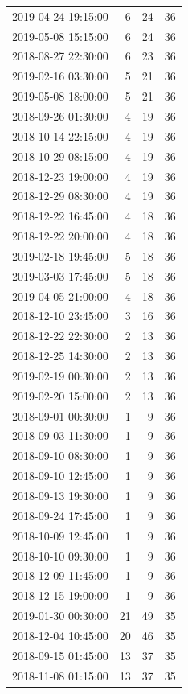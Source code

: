 \begin{tabular}{lrrr}
2019-04-24 19:15:00 & 6 & 24 & 36 \\
2019-05-08 15:15:00 & 6 & 24 & 36 \\
2018-08-27 22:30:00 & 6 & 23 & 36 \\
2019-02-16 03:30:00 & 5 & 21 & 36 \\
2019-05-08 18:00:00 & 5 & 21 & 36 \\
2018-09-26 01:30:00 & 4 & 19 & 36 \\
2018-10-14 22:15:00 & 4 & 19 & 36 \\
2018-10-29 08:15:00 & 4 & 19 & 36 \\
2018-12-23 19:00:00 & 4 & 19 & 36 \\
2018-12-29 08:30:00 & 4 & 19 & 36 \\
2018-12-22 16:45:00 & 4 & 18 & 36 \\
2018-12-22 20:00:00 & 4 & 18 & 36 \\
2019-02-18 19:45:00 & 5 & 18 & 36 \\
2019-03-03 17:45:00 & 5 & 18 & 36 \\
2019-04-05 21:00:00 & 4 & 18 & 36 \\
2018-12-10 23:45:00 & 3 & 16 & 36 \\
2018-12-22 22:30:00 & 2 & 13 & 36 \\
2018-12-25 14:30:00 & 2 & 13 & 36 \\
2019-02-19 00:30:00 & 2 & 13 & 36 \\
2019-02-20 15:00:00 & 2 & 13 & 36 \\
2018-09-01 00:30:00 & 1 & 9 & 36 \\
2018-09-03 11:30:00 & 1 & 9 & 36 \\
2018-09-10 08:30:00 & 1 & 9 & 36 \\
2018-09-10 12:45:00 & 1 & 9 & 36 \\
2018-09-13 19:30:00 & 1 & 9 & 36 \\
2018-09-24 17:45:00 & 1 & 9 & 36 \\
2018-10-09 12:45:00 & 1 & 9 & 36 \\
2018-10-10 09:30:00 & 1 & 9 & 36 \\
2018-12-09 11:45:00 & 1 & 9 & 36 \\
2018-12-15 19:00:00 & 1 & 9 & 36 \\
2019-01-30 00:30:00 & 21 & 49 & 35 \\
2018-12-04 10:45:00 & 20 & 46 & 35 \\
2018-09-15 01:45:00 & 13 & 37 & 35 \\
2018-11-08 01:15:00 & 13 & 37 & 35 \\

\end{tabular}
